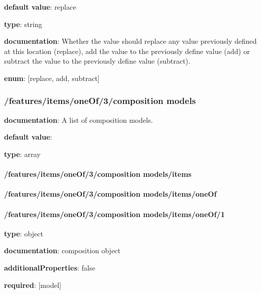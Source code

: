 \begin{itemized}
\item {\bf default value}: replace
\item {\bf type}: string
\item {\bf documentation}: Whether the value should replace any value previously defined at this location (replace), add the value to the previously define value (add) or subtract the value to the previously define value (subtract).
\item {\bf enum}: [replace, add, subtract]\end{itemized}\subsubsection{/features/items/oneOf/3/composition models} \begin{itemized}
\item {\bf documentation}: A list of composition models.
\item {\bf default value}: 
\item {\bf type}: array
\paragraph{/features/items/oneOf/3/composition models/items} \begin{itemized}
\end{itemized}\end{itemized}\paragraph{/features/items/oneOf/3/composition models/items/oneOf} \begin{itemized}
\end{itemized}\paragraph{/features/items/oneOf/3/composition models/items/oneOf/1} \begin{itemized}
\item {\bf type}: object
\item {\bf documentation}: composition object
\item {\bf additionalProperties}: false
\item {\bf required}: [model]\end{itemized}

